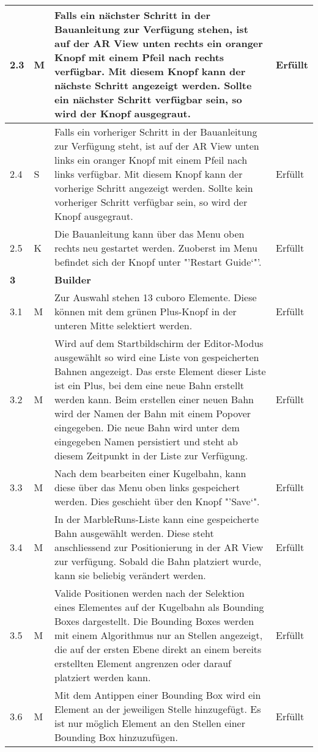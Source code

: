\begin{longtable}{l l p{10cm} l}
	\hline
	2.3 & M & Falls ein nächster Schritt in der Bauanleitung zur Verfügung stehen, ist auf der AR View unten rechts ein oranger Knopf mit einem Pfeil nach rechts verfügbar. Mit diesem Knopf kann der nächste Schritt angezeigt werden. Sollte ein nächster Schritt verfügbar sein, so wird der Knopf ausgegraut. & Erfüllt \\
	\hline
	2.4 & S & Falls ein vorheriger Schritt in der Bauanleitung zur Verfügung steht, ist auf der AR View unten links ein oranger Knopf mit einem Pfeil nach links verfügbar. Mit diesem Knopf kann der vorherige Schritt angezeigt werden. Sollte kein vorheriger Schritt verfügbar sein, so wird der Knopf ausgegraut. & Erfüllt \\
	\hline
	2.5 & K & Die Bauanleitung kann über das Menu oben rechts neu gestartet werden. Zuoberst im Menu befindet sich der Knopf unter "'Restart Guide`"'. & Erfüllt \\
	\hline
	\textbf{3} & & \textbf{Builder} & \\
	\hline
	3.1 & M & Zur Auswahl stehen 13 cuboro Elemente. Diese können mit dem grünen Plus-Knopf in der unteren Mitte selektiert werden. & Erfüllt \\
	\hline
	3.2 & M & Wird auf dem Startbildschirm der Editor-Modus ausgewählt so wird eine Liste von gespeicherten Bahnen angezeigt. Das erste Element dieser Liste ist ein Plus, bei dem eine neue Bahn erstellt werden kann. Beim erstellen einer neuen Bahn wird der Namen der Bahn mit einem Popover eingegeben. Die neue Bahn wird unter dem eingegeben Namen persistiert und steht ab diesem Zeitpunkt in der Liste zur Verfügung. & Erfüllt \\
	\hline
	3.3 & M & Nach dem bearbeiten einer Kugelbahn, kann diese über das Menu oben links gespeichert werden. Dies geschieht über den Knopf "'Save`". & Erfüllt \\
	\hline
	3.4 & M & In der MarbleRuns-Liste kann eine gespeicherte Bahn ausgewählt werden. Diese steht anschliessend zur Positionierung in der AR View zur verfügung. Sobald die Bahn platziert wurde, kann sie beliebig verändert werden. & Erfüllt \\
	\hline
	3.5 & M & Valide Positionen werden nach der Selektion eines Elementes auf der Kugelbahn als Bounding Boxes dargestellt. Die Bounding Boxes werden mit einem Algorithmus nur an Stellen angezeigt, die auf der ersten Ebene direkt an einem bereits erstellten Element angrenzen oder darauf platziert werden kann. & Erfüllt \\
	\hline
	3.6 & M & Mit dem Antippen einer Bounding Box wird ein Element an der jeweiligen Stelle hinzugefügt. Es ist nur möglich Element an den Stellen einer Bounding Box hinzuzufügen. & Erfüllt \\

\end{longtable}
